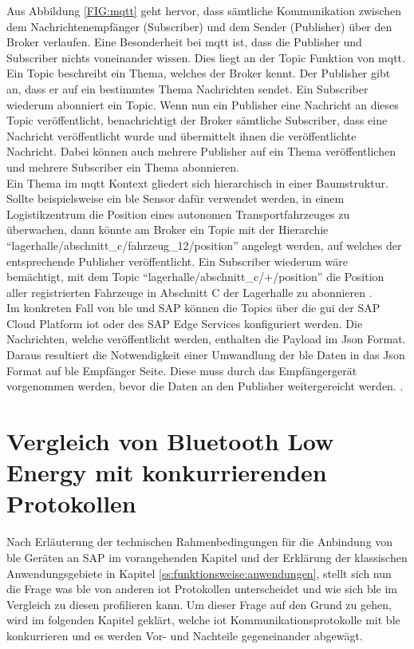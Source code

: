 \noindent Aus Abbildung \ref{FIG:mqtt} geht hervor, dass sämtliche Kommunikation zwischen dem Nachrichtenempfänger (Subscriber) und dem Sender (Publisher) über den Broker verlaufen. Eine Besonderheit bei \ac{mqtt} ist, dass die Publisher und Subscriber nichts voneinander wissen. Dies liegt an der Topic Funktion von \ac{mqtt}. Ein Topic beschreibt ein Thema, welches der Broker kennt. Der Publisher gibt an, dass er auf ein bestimmtes Thema Nachrichten sendet. Ein Subscriber wiederum abonniert ein Topic. Wenn nun ein Publisher eine Nachricht an dieses Topic veröffentlicht, benachrichtigt der Broker sämtliche Subscriber, dass eine Nachricht veröffentlicht wurde und übermittelt ihnen die veröffentlichte Nachricht. Dabei können auch mehrere Publisher auf ein Thema veröffentlichen und mehrere Subscriber ein Thema abonnieren.\\
\noindent Ein Thema im \ac{mqtt} Kontext gliedert sich hierarchisch in einer Baumstruktur. Sollte beispielsweise ein \ac{ble} Sensor dafür verwendet werden, in einem Logistikzentrum die Position eines autonomen Transportfahrzeuges zu überwachen, dann könnte am Broker ein Topic mit der Hierarchie "`lagerhalle/abschnitt\_c/fahrzeug\_12/position"' angelegt werden, auf welches der entsprechende Publisher veröffentlicht. Ein Subscriber wiederum wäre bemächtigt, mit dem Topic "`lagerhalle/abschnitt\_c/+/position"' die Position aller registrierten Fahrzeuge in Abschnitt C der Lagerhalle zu abonnieren \cite{MQTT19:WWW}.\\
\noindent Im konkreten Fall von \ac{ble} und SAP können die Topics über die \ac{gui} der SAP Cloud Platform \ac{iot} oder des SAP Edge Services konfiguriert werden. Die Nachrichten, welche veröffentlicht werden, enthalten die Payload im Json Format. Daraus resultiert die Notwendigkeit einer Umwandlung der \ac{ble} Daten in das Json Format auf \ac{ble} Empfänger Seite. Diese muss durch das Empfängergerät vorgenommen werden, bevor die Daten an den Publisher weitergereicht werden. \cite[Seite 247]{Holtschulte20:IOS}.\\ 

\section{Vergleich von Bluetooth Low Energy mit konkurrierenden Protokollen}
\label{s:vergleich} 

\noindent Nach Erläuterung der technischen Rahmenbedingungen für die Anbindung von \ac{ble} Geräten an SAP im vorangehenden Kapitel und der Erklärung der klassischen Anwendungsgebiete in Kapitel \ref{ss:funktionsweise:anwendungen}, stellt sich nun die Frage was \ac{ble} von anderen \ac{iot} Protokollen unterscheidet und wie sich \ac{ble} im Vergleich zu diesen profilieren kann. Um dieser Frage auf den Grund zu gehen, wird im folgenden Kapitel geklärt, welche \ac{iot} Kommunikationsprotokolle mit \ac{ble} konkurrieren und es werden Vor- und Nachteile gegeneinander abgewägt.\\ 

